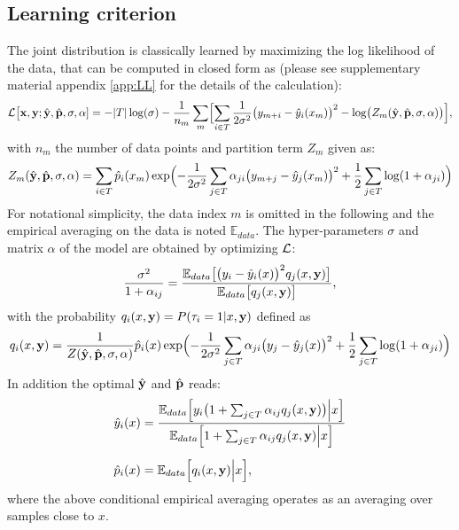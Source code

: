 \subsection{Learning criterion}
The joint distribution is classically learned by maximizing the log likelihood of the data, that can be computed 
in closed form as (please see supplementary material appendix \ref{app:LL} for the details of the calculation): 
\begin{equation}\label{eq:LL}
{\cal L}\bigl[ {\bf x, y};\hat {\bf y},\hat{\bf p},\sigma,{\bf \alpha}] = -\vert T\vert\log(\sigma)-\frac{1}{n_m}\sum_m\Bigl[\sum_{i \in T}\frac{1}{2\sigma^2}\bigl(
y_{m+i}-\hat y_i(x_m)\bigr)^2
-\log\bigl(Z_m(\hat {\bf y},\hat{\bf p},\sigma,{\bf \alpha})\bigr)\Bigr],
\end{equation}
with $n_m$ the number of data points and partition term $Z_m$ given as:
\[
Z_m(\hat {\bf y},\hat{\bf p},\sigma,{\bf \alpha}) = \sum_{i \in T}\hat p_i(x_m)\exp\Bigl(-\frac{1}{2\sigma^2}\sum_{j\in T}\alpha_{ji}\bigl(y_{m+j}-\hat y_j(x_m)\bigr)^2+\frac{1}{2}\sum_{j\in T}\log(1+\alpha_{ji})\Bigr)
\]
For notational simplicity, the data index $m$ is omitted in the following and the empirical averaging on the data is noted ${\mathbb E}_{data}$.
The hyper-parameters $\sigma$ and matrix $\alpha$ of the model are obtained by optimizing  ${\cal L}$:
\begin{equation}\label{eq:var}
\frac{\sigma^2}{1+\alpha_{ij}} = \frac{{\mathbb E}_{data}\bigl[\bigl(y_i-\hat y_i(x)\bigr)^2q_j(x,{\bf y})\bigr]}
{{\mathbb E}_{data}\bigl[q_j(x,{\bf y})\bigr]},
\end{equation}
with the probability $q_i(x,{\bf y}) = P(\tau_i=1\vert x,{\bf y})$ defined as
\begin{equation}\label{eq:hatpi}
q_i(x,{\bf y}) = \frac{1}{Z(\hat {\bf y},\hat{\bf p},\sigma,{\bf \alpha})}\hat p_i(x)\exp\Bigl(-\frac{1}{2\sigma^2}\sum_{j\in T}\alpha_{ji}\bigl(y_j-\hat y_j(x)\bigr)^2+\frac{1}{2}\sum_{j\in T}\log(1+\alpha_{ji})\Bigr)
\end{equation}
In addition the optimal $\hat {\bf y}$ and $\hat{\bf p}$ reads:%
\begin{align}
\hat y_i(x) &= \frac{{\mathbb E}_{data}\Bigl[y_i\bigl(1+\sum_{j\in T}\alpha_{ij}q_j(x,{\bf y})\bigr)\Big\vert x\Bigr]}
{{\mathbb E}_{data}\Bigl[1+\sum_{j\in T}\alpha_{ij}q_j(x,{\bf y})\Big\vert x\Bigr]}\label{eq:hyopt}\\[0.2cm]
\hat p_i(x) &= {\mathbb E}_{data}\Bigl[q_i(x,{\bf y})\Big\vert x \Bigr],\label{eq:tildep}
\end{align}
where the above conditional empirical averaging operates as an averaging over samples close to $x$.

